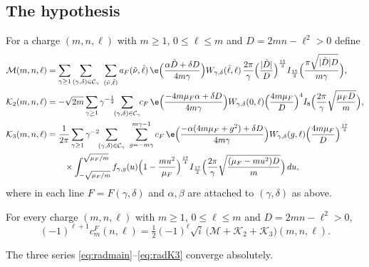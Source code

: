 \subsection{The hypothesis}
For a charge $(m,n,\ell)$ with $m\ge1$, $0\le\ell\le m$ and $D=2mn-\ell^2>0$ define
\begin{align}
\mathcal M(m,n,\ell)&=\sum_{\gamma\ge1}\sum_{(\gamma,\delta)\in\mathcal C_\gamma}\ \sum_{(\tilde\nu,\tilde\ell)}a_{F}(\tilde\nu,\tilde\ell)\,\e\Big(\frac{\alpha\tilde D+\delta D}{4m\gamma}\Big)W_{\gamma,\delta}(\tilde\ell,\ell)\,\frac{2\pi}\gamma\Big(\frac{|\tilde D|}{D}\Big)^{\frac{15}4}I_{\frac{15}2}\Big(\frac{\pi\sqrt{|\tilde D|D}}{m\gamma}\Big),\label{eq:radmain}\\
\mathcal K_2(m,n,\ell)&=-\sqrt{2m}\sum_{\gamma\ge1}\gamma^{-\frac12}\!\!\sum_{(\gamma,\delta)\in\mathcal C_\gamma}\!\! c_F\,\e\Big(\frac{-4m\mu_F\alpha+\delta D}{4m\gamma}\Big)W_{\gamma,\delta}(0,\ell)\Big(\frac{4m\mu_F}{D}\Big)^4I_8\Big(\frac{2\pi}\gamma\sqrt{\frac{\mu_FD}m}\Big),\label{eq:radK2}\\
\mathcal K_3(m,n,\ell)&=\frac1{2\pi}\sum_{\gamma\ge1}\gamma^{-2}\!\!\sum_{(\gamma,\delta)\in\mathcal C_\gamma}\ \sum_{g=-m\gamma}^{m\gamma-1}c_F\,\e\Big(\frac{-\alpha(4m\mu_F+g^2)+\delta D}{4m\gamma}\Big)W_{\gamma,\delta}(g,\ell)\Big(\frac{4m\mu_F}{D}\Big)^{\frac{17}4}\label{eq:radK3}\\
&\qquad\times\int_{-\sqrt{\mu_F/m}}^{\sqrt{\mu_F/m}}f_{\gamma,g}(u)\Big(1-\frac{mu^2}{\mu_F}\Big)^{\frac{17}4}I_{\frac{17}2}\Big(\frac{2\pi}\gamma\sqrt{\frac{(\mu_F-mu^2)D}m}\Big)\,du,\notag
\end{align}
where in each line $F=F(\gamma,\delta)$ and $\alpha,\beta$ are attached to $(\gamma,\delta)$ as above.

\begin{hypothesis}\label{hyp:R}
For every charge $(m,n,\ell)$ with $m\ge1$, $0\le\ell\le m$ and $D=2mn-\ell^2>0$,
\begin{equation}\label{eq:hypR}
(-1)^{\ell+1}c^F_m(n,\ell)=\tfrac12(-1)^\ell\sqrt i\,\big(\mathcal M+\mathcal K_2+\mathcal K_3\big)(m,n,\ell).
\end{equation}
\end{hypothesis}

\begin{lemma}\label{lem:radconv}
The three series \eqref{eq:radmain}--\eqref{eq:radK3} converge absolutely.
\end{lemma}

